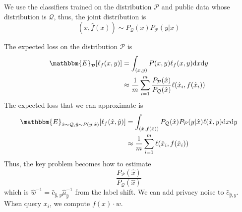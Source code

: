 \documentclass{article}
\theoremstyle{definition}
\begin{document}
We use the classifiers trained on the distribution $\mathcal{P}$ and public data whose distribution is $\mathcal{Q}$, thus, the joint distribution is
\[
(x,\hat{f}(x))\sim P_\mathcal{Q}(x)P_\mathcal{P}(y|x)
\]

The expected loss on the distribution $\mathcal{P}$ is
\begin{align*}
\mathbbm{E}_{\mathcal{P}}[\ell_f(x,y)]&=\int_{(x,y)}P(x,y)\ell_f(x,y){\rm d}x{\rm d}y\\
&\approx \frac{1}{m}\sum_{i=1}^m \frac{P_\mathcal{P}(\hat{x})}{P_\mathcal{Q}(\hat{x})}\ell(\hat{x}_i,f(\hat{x}_i))
\end{align*}
The expected loss that we can approximate is
\begin{align*}
\mathbbm{E}_{\hat{x}\sim \mathcal{Q},\hat{y}\sim P(y|\hat{x})}[\ell_f(\hat{x},\hat{y})]&=\int_{(\hat{x},f(\hat{x}))}P_\mathcal{Q}(\hat{x})P_\mathcal{P}(y|\hat{x})\ell(\hat{x},y){\rm d}x{\rm d}y\\
&\approx \frac{1}{m}\sum_{i=1}^{m}\ell(\hat{x}_i,f(\hat{x}_i))
\end{align*}
Thus, the key problem becomes how to estimate
\[
\frac{P_\mathcal{P}(\hat{x})}{P_\mathcal{Q}(\hat{x})}
\]
which is $\hat{w}^{-1}=\hat{c}_{\hat{y},y}\hat{\mu}^{-1}_{\hat{y}}$ from the label shift. We can add privacy noise to $\hat{c}_{\hat{y},y}$. When query $x_i$, we compute $f(x)\cdot w$.
\end{document}
